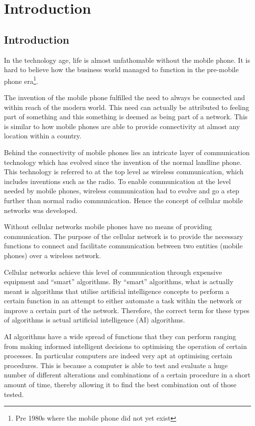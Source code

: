 \chapter{Introduction}
\section{Introduction}
In the technology age, life is almost unfathomable without the mobile phone. It is hard to believe how the business world managed to function in the pre-mobile phone era\footnote{Pre 1980s where the mobile phone did not yet exist}. 

The invention of the mobile phone fulfilled the need to always be connected and within reach of the modern world. This need can actually be attributed to feeling part of something and this something is deemed as being part of a network. This is similar to how mobile phones are able to provide connectivity at almost any location within a country.

Behind the connectivity of mobile phones lies an intricate layer of communication technology which has evolved since the invention of the normal landline phone. This technology is referred to at the top level as wireless communication, which includes inventions such as the radio. To enable communication at the level needed by mobile phones, wireless communication had to evolve and go a step further than normal radio communication. Hence the concept of cellular mobile networks was developed.

Without cellular networks mobile phones have no means of providing communication. The purpose of the cellular network is to provide the necessary functions to connect and facilitate communication between two entities (mobile phones) over a wireless network. 

Cellular networks achieve this level of communication through expensive equipment and ``smart'' algorithms. By ``smart'' algorithms, what is actually meant is algorithms that utilise artificial intelligence concepts to perform a certain function in an attempt to either automate a task within the network or improve a certain part of the network. Therefore, the correct term for these types of algorithms is actual artificial intelligence (AI) algorithms.

AI algorithms have a wide spread of functions that they can perform ranging from making informed intelligent decisions to optimising the operation of certain processes. In particular computers are indeed very apt at optimising certain procedures. This is because a computer is able to test and evaluate a huge number of different alterations and combinations of a certain procedure in a short amount of time, thereby allowing it to find the best combination out of those tested.

